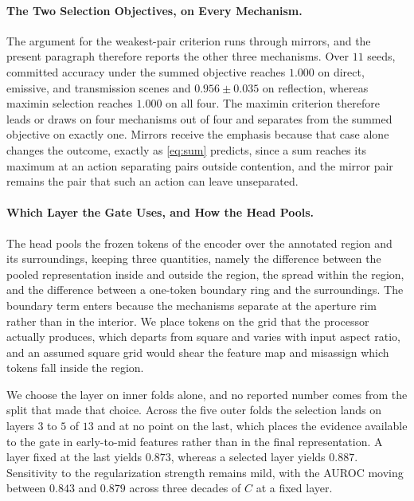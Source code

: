 \documentclass{article} %
\theoremstyle{defstyle}
\theoremstyle{plain}
\begin{document}
\paragraph{The Two Selection Objectives, on Every Mechanism.}
The argument for the weakest-pair criterion runs through mirrors, and the present paragraph
therefore reports the other three mechanisms. Over $11$ seeds, committed accuracy under the
summed objective reaches $1.000$ on direct, emissive, and transmission scenes and
$0.956 \pm 0.035$ on reflection, whereas maximin selection reaches $1.000$ on all four. The
maximin criterion therefore leads or draws on four mechanisms out of four and separates from
the summed objective on exactly one. Mirrors receive the emphasis because that case alone
changes the outcome, exactly as \eqref{eq:sum} predicts, since a sum reaches its maximum at
an action separating pairs outside contention, and the mirror pair remains the pair that such
an action can leave unseparated.

\paragraph{Which Layer the Gate Uses, and How the Head Pools.}
The head pools the frozen tokens of the encoder over the annotated region and its
surroundings, keeping three quantities, namely the difference between the pooled
representation inside and outside the region, the spread within the region, and the
difference between a one-token boundary ring and the surroundings. The boundary term enters
because the mechanisms separate at the aperture rim rather than in the interior. We place
tokens on the grid that the processor actually produces, which departs from square and varies
with input aspect ratio, and an assumed square grid would shear the feature map and misassign
which tokens fall inside the region.

We choose the layer on inner folds alone, and no reported number comes from the split that
made that choice. Across the five outer folds the selection lands on layers $3$ to $5$ of
$13$ and at no point on the last, which places the evidence available to the gate in
early-to-mid features rather than in the final representation. A layer fixed at the last
yields $0.873$, whereas a selected layer yields $0.887$. Sensitivity to the regularization
strength remains mild, with the AUROC moving between $0.843$ and $0.879$ across three decades
of $C$ at a fixed layer.
\end{document}
